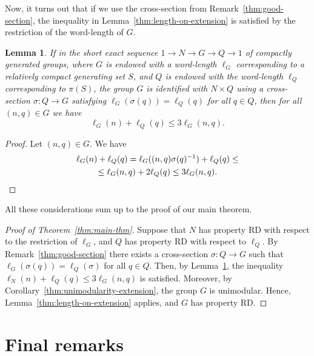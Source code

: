 \documentclass{amsart}
\newtheorem{lemma}[theorem]{Lemma}
\theoremstyle{definition}
\theoremstyle{remark}
\begin{document}
Now, it turns out that if we use the cross-section from
Remark~\ref{thm:good-section}, the inequality in
Lemma~\ref{thm:length-on-extension} is satisfied by the restriction of
the word-length of $G$.

\begin{lemma}
  \label{thm:final-length-inequality}
  If in the short exact sequence $1\to N\to G\to Q\to 1$ of compactly
  generated groups, where $G$ is endowed with a word-length $\ell_G$
  corresponding to a relatively compact generating set $S$, and $Q$ is
  endowed with the word-length $\ell_Q$ corresponding to $\pi(S)$, the
  group $G$ is identified with $N\times Q$ using a cross-section
  $\sigma\colon Q\to G$ satisfying $\ell_G(\sigma(q))=\ell_Q(q)$ for
  all $q\in Q$, then for all $(n,q)\in G$ we have
  \begin{equation}
    \ell_G(n)+\ell_Q(q) \leq 3 \ell_G(n,q).
  \end{equation}
\end{lemma}

\begin{proof}
  Let $(n,q)\in G$. We have
  \begin{multline}
    \ell_G(n)+\ell_Q(q) = \ell_G((n,q)\sigma(q)^{-1}) + \ell_Q(q) \leq\\\leq
    \ell_G(n,q) + 2\ell_Q(q) \leq 3\ell_G(n,q).\qedhere
  \end{multline}
\end{proof}

All these considerations sum up to the proof of our main theorem.

\begin{proof}[Proof of Theorem~\ref{thm:main-thm}]
  Suppose that $N$ has property RD with respect to the restriction of
  $\ell_G$, and $Q$ has property RD with respect to $\ell_Q$. By
  Remark~\ref{thm:good-section} there exists a cross-section
  $\sigma\colon Q\to G$ such that $\ell_G(\sigma(q))=\ell_Q(\sigma)$
  for all $q\in Q$. Then, by Lemma~\ref{thm:final-length-inequality}, the
  inequality $\ell_N(n)+\ell_Q(q) \leq 3\ell_G(n,q)$ is
  satisfied. Moreover, by Corollary~\ref{thm:unimodularity-extension},
  the group $G$ is unimodular. Hence,
  Lemma~\ref{thm:length-on-extension} applies, and $G$ has property RD.
\end{proof}

\section{Final remarks}
\label{sec:final-remarks}
\end{document}
